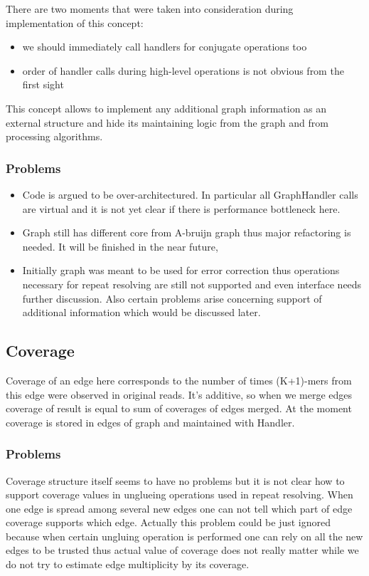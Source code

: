 \documentclass[12pt]{article}
\begin{document}
There are two moments that were taken into consideration during implementation of this concept:
\begin{itemize}
\item we should immediately call handlers for conjugate operations too
\item order of handler calls during high-level operations is not obvious from the first sight
\end{itemize}

This concept allows to implement any additional graph information as an external structure and hide its maintaining logic from the graph and from processing algorithms. 

\subsubsection{Problems}
\begin{itemize}
\item Code is argued to be over-architectured. In particular all GraphHandler calls are virtual and it is not yet clear if there is performance bottleneck here.
\item Graph still has different core from A-bruijn graph thus major refactoring is needed. It will be finished in the near future,
\item Initially graph was meant to be used for error correction thus operations necessary for repeat resolving are still not supported and even interface needs further discussion. Also certain problems arise concerning support of additional information which would be discussed later.
\end{itemize}

\subsection{Coverage}

Coverage of an edge here corresponds to the number of times (K+1)-mers from this edge were observed in original reads. It's additive, so when we merge edges coverage of result is equal to sum of coverages of edges merged. At the moment coverage is stored in edges of graph and maintained with Handler.

\subsubsection{Problems}

Coverage structure itself seems to have no problems but it is not clear how to support coverage values in unglueing operations used in repeat resolving. When one edge is spread among several new edges one can not tell which part of edge coverage supports which edge. Actually this problem could be just ignored because when certain ungluing operation is performed one can rely on all the new edges to be trusted thus actual value of coverage does not really matter while we do not try to estimate edge multiplicity by its coverage.
\end{document}
